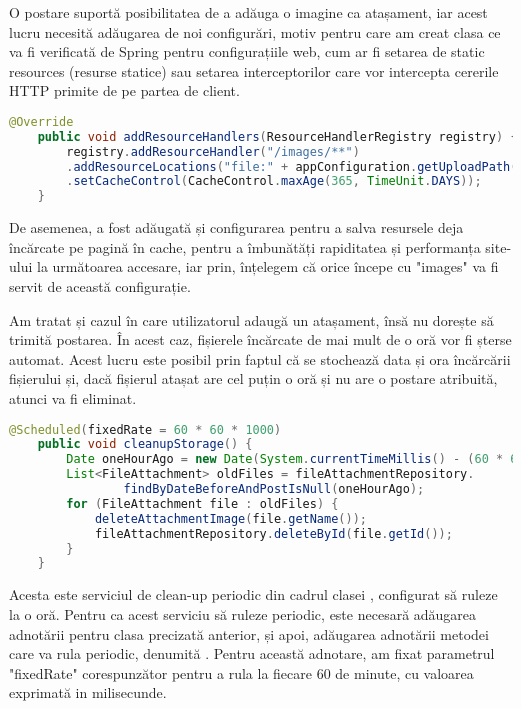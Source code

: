 O postare suportă posibilitatea de a adăuga o imagine ca atașament, iar acest lucru necesită adăugarea de noi configurări, motiv pentru care am creat clasa  ce va fi verificată de Spring pentru configurațiile web, cum ar fi setarea de static resources (resurse statice) sau setarea interceptorilor care vor intercepta cererile HTTP primite de pe partea de client.\newline

\begin{lstlisting}[language=Java]
	    @Override
	public void addResourceHandlers(ResourceHandlerRegistry registry) {
		registry.addResourceHandler("/images/**")
		.addResourceLocations("file:" + appConfiguration.getUploadPath() + "/")
		.setCacheControl(CacheControl.maxAge(365, TimeUnit.DAYS));
	}
\end{lstlisting}
\bigskip
De asemenea, a fost adăugată și configurarea pentru a salva resursele deja încărcate pe pagină în cache, pentru a îmbunătăți rapiditatea și performanța site-ului la următoarea accesare, iar prin\newline {}, înțelegem că orice începe cu "images" va fi servit de această configurație.\newline

Am tratat și cazul în care utilizatorul adaugă un atașament, însă nu dorește să trimită postarea. În acest caz, fișierele încărcate de mai mult de o oră vor fi șterse automat. Acest lucru este posibil prin faptul că se stochează data și ora încărcării fișierului și, dacă fișierul atașat are cel puțin o oră și nu are o postare atribuită, atunci va fi eliminat.\newline

\begin{lstlisting}[language=Java]
	@Scheduled(fixedRate = 60 * 60 * 1000)
	public void cleanupStorage() {
		Date oneHourAgo = new Date(System.currentTimeMillis() - (60 * 60 * 1000));
		List<FileAttachment> oldFiles = fileAttachmentRepository.
				findByDateBeforeAndPostIsNull(oneHourAgo);
		for (FileAttachment file : oldFiles) {
			deleteAttachmentImage(file.getName());
			fileAttachmentRepository.deleteById(file.getId());
		}
	}
\end{lstlisting}
\bigskip

Acesta este serviciul de clean-up periodic din cadrul clasei , configurat să ruleze la o oră. Pentru ca acest serviciu să ruleze periodic, este necesară adăugarea adnotării  pentru clasa precizată anterior, și apoi, adăugarea adnotării  metodei care va rula periodic, denumită . Pentru această adnotare, am fixat parametrul "fixedRate" corespunzător pentru a rula la fiecare 60 de minute, cu valoarea exprimată in milisecunde.\newline

